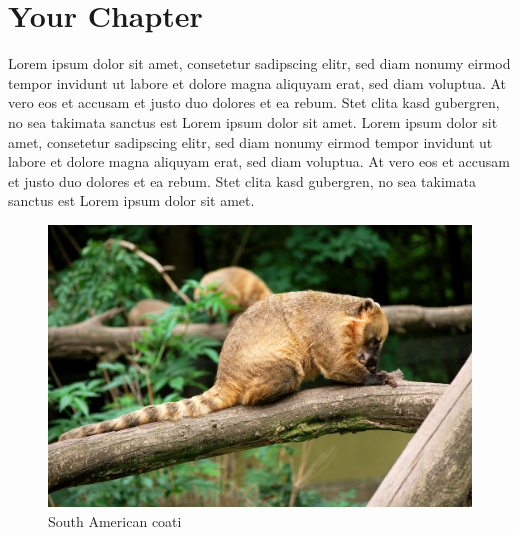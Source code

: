 \documentclass[a4paper]{scrreprt}
\begin{document}
\chapter{Your Chapter}
Lorem ipsum dolor sit amet, consetetur sadipscing elitr, sed diam 
nonumy eirmod tempor invidunt ut labore et dolore magna aliquyam 
erat, sed diam voluptua. At vero eos et accusam et justo duo dolores 
et ea 
rebum. Stet clita kasd gubergren, no sea takimata sanctus est Lorem 
ipsum dolor sit amet. Lorem ipsum dolor sit amet, consetetur 
sadipscing elitr, sed diam nonumy eirmod tempor invidunt ut labore et
dolore magna aliquyam erat, sed diam voluptua. At vero eos et accusam
et justo duo dolores et ea rebum. Stet clita kasd gubergren, no sea 
takimata sanctus est Lorem ipsum dolor sit amet.

\begin{figure}[ht]
    \begin{minipage}[b]{0.45\linewidth}
        \centering
        \includegraphics[width=\textwidth]{YourImage.jpg}
        \caption{South American coati}
        \label{fig:nasua}
    \end{minipage}
    \hspace{0.5cm}
    \begin{minipage}[b]{0.45\linewidth}
        \centering

\end{minipage}
\end{figure}
\end{document}
